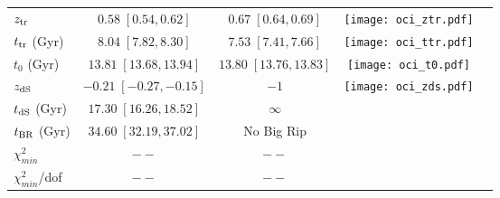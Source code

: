 \documentclass[11pt,a4paper]{article}
\begin{document}
\begin{table}[htb!]
\begin{tabular}{lcccc}
  $z_{\rm tr}$ & $0.58\;[0.54,0.62]$  & $0.67\;[0.64,0.69]$& \begin{minipage}{3cm}
      \texttt{[image: oci\_ztr.pdf]}
    \end{minipage} \\[8pt]
 
 $t_{\rm tr}$ (Gyr) & $8.04\;[7.82,8.30]$ & $7.53\;[7.41,7.66]$&\begin{minipage}{3cm}
      \texttt{[image: oci\_ttr.pdf]}
    \end{minipage}  \\[8pt]
 
 $t_0 $ (Gyr)& $13.81\;[13.68,13.94]$ & $13.80\; [13.76,13.83]$ &\begin{minipage}{3cm}
      \texttt{[image: oci\_t0.pdf]}
    \end{minipage}  \\[8pt]
 
 $z_{\rm dS}$ & $-0.21\;[-0.27,-0.15]$  & $-1$ &\begin{minipage}{3cm}
      \texttt{[image: oci\_zds.pdf]}
    \end{minipage} \\[8pt]
 
 $t_{\rm dS}$ (Gyr) & $17.30\; [16.26,18.52]$ & $\infty$& \\[8pt]
 
$t_{\rm BR} $ (Gyr)& $34.60\;[ 32.19,37.02]$ & No Big Rip& \\[8pt]
 
 \hline
$\chi^2_{min}$ & $--$& $--$& \\[8pt]
$\chi^2_{min}$/dof & $--$& $--$& \\[8pt]
\hline\hline
\end{tabular}
\label{table:BRLCDM}
\end{table}
\end{document}
